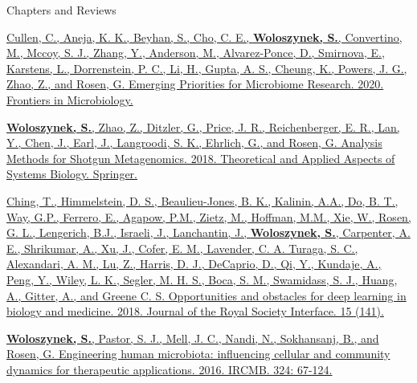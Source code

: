 \begin{cventries}
\vspace{.5cm}
\cventry
    {}
    {Chapters and Reviews}
    {}
    {}
    {
     \begin{cvitems} %
        \item{\href{https://doi.org/10.3389/fmicb.2020.00136}{Cullen, C., Aneja, K. K., Beyhan, S., Cho, C. E., \textbf{\underline{Woloszynek, S.}}, Convertino, M., Mccoy, S. J., Zhang, Y., Anderson, M., Alvarez-Ponce, D., Smirnova, E., Karstens, L., Dorrenstein, P. C., Li, H., Gupta, A. S., Cheung, K., Powers, J. G., Zhao, Z., and Rosen, G. Emerging Priorities for Microbiome Research. 2020. Frontiers in Microbiology.}}
        \item{\href{https://doi.org/10.1007/978-3-319-74974-7}{\textbf{\underline{Woloszynek, S.}}, Zhao, Z., Ditzler, G., Price, J. R., Reichenberger, E. R., Lan, Y., Chen, J., Earl, J., Langroodi, S. K., Ehrlich, G., and Rosen, G. Analysis Methods for Shotgun Metagenomics. 2018. Theoretical and Applied Aspects of Systems Biology. Springer.}}
        \item{\href{https://doi.org/10.1098/rsif.2017.0387}{Ching, T., Himmelstein, D. S., Beaulieu-Jones, B. K., Kalinin, A.A., Do, B. T., Way, G.P., Ferrero, E., Agapow, P.M., Zietz, M., Hoffman, M.M., Xie, W., Rosen, G. L., Lengerich, B.J., Israeli, J., Lanchantin, J., \textbf{\underline{Woloszynek, S.}}, Carpenter, A. E., Shrikumar, A., Xu, J., Cofer, E. M., Lavender, C. A. Turaga, S. C., Alexandari, A. M., Lu, Z., Harris, D. J., DeCaprio, D., Qi, Y., Kundaje, A., Peng, Y., Wiley, L. K., Segler, M. H. S., Boca, S. M., Swamidass, S. J., Huang, A., Gitter, A., and Greene C. S. Opportunities and obstacles for deep learning in biology and medicine. 2018. Journal of the Royal Society Interface. 15 (141).}}
        \item{\href{https://doi.org/10.1016/bs.ircmb.2016.01.003}{\textbf{\underline{Woloszynek, S.}}, Pastor, S. J., Mell, J. C., Nandi, N., Sokhansanj, B., and Rosen, G. Engineering human microbiota: influencing cellular and community dynamics for therapeutic applications. 2016. IRCMB. 324: 67-124.}}
      \end{cvitems}
    }
    

\end{cventries}
